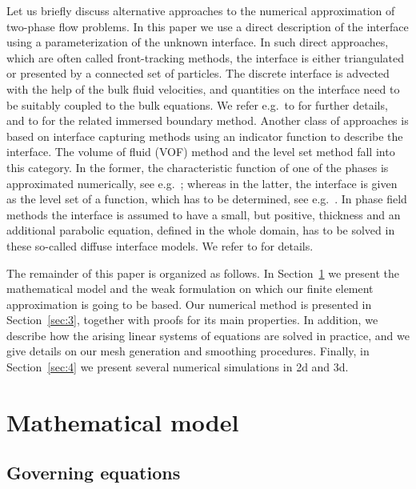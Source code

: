 \documentclass[a4paper,12pt,onecolumn]{article}
\begin{document}
Let us briefly discuss alternative approaches to the numerical approximation of
two-phase flow problems. In this paper we use a direct description of the
interface using a parameterization of the unknown interface. In such direct
approaches, which are often called front-tracking methods, the interface is
either triangulated or presented by a connected set of particles. The discrete
interface is advected with the help of the bulk fluid velocities, and
quantities on the interface need to be suitably coupled to the bulk equations.  
We refer e.g.\ to 
\cite{UnverdiT92,Bansch01,Tryggvason_etal01,GanesanMT07,GanesanT08,spurious} for
further details, and to \cite{LevequeL97,Peskin02} for the related immersed boundary method.
Another class of approaches is
based on interface capturing methods using an indicator function to
describe the interface. The volume of fluid (VOF) method and the level set 
method fall into this category.
In the former, the characteristic function of one of the phases is
approximated numerically, see e.g.\ \cite{HirtN81,RenardyR02,Popinet09};
whereas in the latter, the interface is given as the level set of a function, 
which has to be
determined, see e.g.\ \cite{SussmanSO94,Sethian99,OsherF03,GrossR07}. 
In phase field methods the interface is assumed
to have a small, but positive, thickness and an additional parabolic
equation, defined in the whole domain, has to be solved in these
so-called diffuse interface models. We refer to
\cite{HohenbergH77,AndersonMW98,LowengrubT98,Feng06,KaySW08,AbelsGG12,GrunK14}
for details.

The remainder of this paper is organized as follows. In Section~\ref{sec:2}
we present the mathematical model and the weak formulation on which our finite
element approximation is going to be based. Our numerical method is presented
in Section~\ref{sec:3}, together with proofs for its main properties. In
addition, we describe how the arising linear systems of equations are solved in
practice, and we give details on our mesh generation and smoothing procedures.
Finally, in Section~\ref{sec:4} we present several numerical simulations in 2d
and 3d.

\section{Mathematical model} \label{sec:2}

\subsection{Governing equations}
\end{document}
